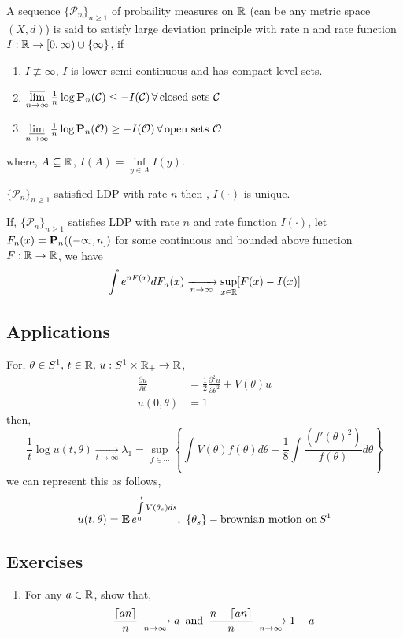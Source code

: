 \documentclass[main]{subfiles}
\begin{document}
\vspace{-0.25cm}
A sequence $\{\mathcal{P}_n\}_{n \geq 1}$ of probaility measures on $\R$ (can be any metric space $(X,d)$) is said to satisfy large deviation principle with rate n and rate function $I : \R \to \left[0,\infty\right) \cup \{\infty\}$, if 
\begin{enumerate}
	\item $I \not\equiv \infty$, $I$ is lower-semi continuous and has compact level sets.
	\item $\uplim \limits_{n \to \infty}\frac{1}{n} \log \P_{n}(\mathcal{C}) \leq -I(\mathcal{C})\,\forall\,\text{closed sets}\,\, \mathcal{C}$
	\item  $\lowlim \limits_{n \to \infty}\frac{1}{n} \log \P_{n}(\mathcal{O}) \geq -I(\mathcal{O})\,\forall\,\text{open sets}\,\, \mathcal{O}$
\end{enumerate}
where, $A \subseteq \R$, $I(A)= \inf\limits_{y \in A}I(y)$. 

\begin{theorem}
	$\{\mathcal{P}_n\}_{n \geq 1}$ satisfied LDP with rate $n$ then , $I(\cdot)$ is unique.
\end{theorem}
\begin{theorem}
	If, $\{\mathcal{P}_n\}_{n \geq 1}$ satisfies LDP with rate $n$ and rate function $I(\cdot)$, let $F_n(x) = \P_{n}(\left(-\infty,n \right])$ for some continuous and bounded above function $F : \R \to \R$, we have 
	$$\int e^{n F(x)} dF_n(x) \xrightarrow[n \to \infty]{} \sup\limits_{x \in \R}[F(x) - I(x)]$$
\end{theorem}
\subsection*{Applications}
For, $\theta \in S^1,\,t \in \R,\,u : S^1 \times \R_{+} \to \R$, 
\begin{align*}
	\frac{\partial u}{\partial t} &= \frac{1}{2}\frac{\partial^{2} u}{\partial \theta^2} + V(\theta)u \\
	u(0,\theta) &= 1
\end{align*}
then,  $$\frac{1}{t}\log u(t,\theta) \xrightarrow[t \to \infty]{} \lambda_1 = \sup\limits_{f \in \cdots} \left\{ \int V(\theta)f(\theta)d\theta - \frac{1}{8}\int \frac{(f'(\theta)^2)}{f(\theta)} d\theta \right\}$$
we can represent this as follows, 
$$u(t,\theta) = \E\,e^{\int\limits_{0}^{t}V(\theta_{s})ds},\,\,\{\theta_{s}\} - \text{brownian motion on}\,S^1$$
\subsection*{Exercises}
\begin{enumerate}
	\item For any $a \in \R$, show that, 
	$$\frac{\ceil{an}}{n} \xrightarrow[n \to \infty]{} a \,\,\,\text{and}\,\,\,\frac{n-\ceil{an}}{n} \xrightarrow[n \to \infty]{} 1-a$$
\end{enumerate}
\end{document}
